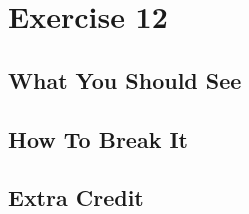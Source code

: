 \chapter{Exercise 12}


\section{What You Should See}


\section{How To Break It}


\section{Extra Credit}



